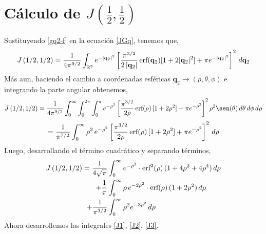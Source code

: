 \documentclass[12pt]{book}
\numberwithin{equation}{chapter}
\def\q{\mathbf{q}}
\def\R{\mathbb{R}}
\def\t{\theta}
\def\r{\rho}
\def\p{\phi}
\def\erf{\hbox{erf}}
\begin{document}
\section{C\'alculo de $J\left(\frac{1}{2},\frac{1}{2} \right)$}

Sustituyendo \eqref{gq2-f} en la ecuaci\'on \eqref{JGq}, tenemos que,
$$ J\left( 1/2,1/2 \right)= \frac{1}{4\pi^{9/2}} \int_{\R^{3}} e^{-|\q_{2}|^{2}} \left[ \frac{\pi^{3/2}}{2\, |\q_{2}|}\, \erf (\q_{2}) [ 1+2|\q_{2}|^{2} ] + \pi e^{-|\q_{2}|^{2}} \right]^{2} \, d\q_{2} $$ 
M\'as aun, haciendo el cambio a coordenadas esf\'ericas $\q_{2} \rightarrow (\r,\t,\p)$ e integrando la parte angular obtenemos,
$$ J\left( 1/2,1/2 \right)= \frac{1}{4\pi^{9/2}} \int_{0}^{\infty} \int_{0}^{2\pi} \int_{0}^{\pi} e^{-\r^{2}} \left[ \frac{\pi^{3/2}}{2\r}\, \erf (\r)\, [ 1+2\r^{2}] +\pi e^{-\r^{2}}  \right]^{2} \r^{2} \sen(\t) \, d\t \, d\p \, d\r $$
$$= \frac{1}{\pi^{7/2}} \int_{0}^{\infty} \r^{2}\, e^{-\r^{2}} \left[ \frac{\pi^{3/2}}{2\r}\, \erf (\r)\, [ 1+2\r^{2}] +\pi e^{-\r^{2}}  \right]^{2}  \, d\r$$
Luego, desarrollando el t\'ermino cuadr\'atico y separando t\'erminos,
\begin{align}
J\left( 1/2,1/2 \right) = \frac{1}{4\sqrt{\pi}} &\int_{0}^{\infty} e^{-\r^{2}}\cdot \erf^{2}(\r)\, ( 1+4\r^{2}+4\r^{4} )\, d\r \label{J1} \\
+ \frac{1}{\pi} &\int_{0}^{\infty} \r \, e^{-2\r^{2}} \cdot \erf(\r)\, ( 1+2\r^{2})\, d\r \label{J2} \\
+ \frac{1}{\pi^{3/2}} &\int_{0}^{\infty} \r^{2} e^{-3\r^{2}} \, d\r \label{J3}
\end{align}
Ahora desarrollemos las integrales \eqref{J1}, \eqref{J2}, \eqref{J3}.\\
\end{document}
